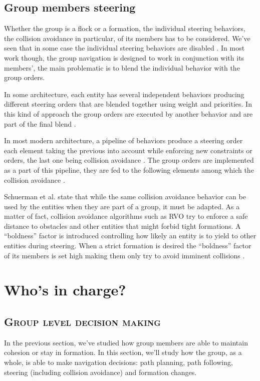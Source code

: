 \documentclass[a4paper,titlepage]{article}
\newcommand{\sectionsubtitle}[1]{{\subsection*{\scshape #1}}}
\begin{document}
\subsection{Group members steering}
\label{sec:stay_grouped:group_members_steering}

Whether the group is a flock or a formation, the individual steering behaviors, the collision avoidance in particular, of its members has to be considered. We’ve seen that in some case the individual steering behaviors are disabled \cite{Pottinger:1999vk}. In most work though, the group navigation is designed to work in conjunction with its members’, the main problematic is to blend the individual behavior with the group orders.

In some architecture, each entity has several independent behaviors producing different steering orders that are blended together using weight and priorities. In this kind of approach the group orders are executed by another behavior and are part of the final blend \cite{Moussaid:2010ib,Qiu:2010ww,Hostetler:2002wg}. 

In most modern architecture, a pipeline of behaviors produce a steering order each element taking the previous into account while enforcing new constraints or orders, the last one being collision avoidance \cite{GolaemPath:tw,Mononen:2010wp}. The group orders are implemented as a part of this pipeline, they are fed to the following elements among which the collision avoidance \cite{Karamouzas:2010fi,Silveira:2008bc}. 

Schuerman et al. state that while the same collision avoidance behavior can be used by the entities when they are part of a group, it must be adapted. As a matter of fact, collision avoidance algorithms such as RVO \cite{vandenBerg:2008tu} try to enforce a safe distance to obstacles and other entities that might forbid tight formations. A “boldness” factor is introduced controlling how likely an entity is to yield to other entities during steering. When a strict formation is desired the “boldness” factor of its members is set high making them only try to avoid imminent collisions \cite{Schuerman:2010um}.

\section{Who's in charge?}
\label{sec:who_s_in_charge}
\sectionsubtitle{Group level decision making}

In the previous section, we've studied how group members are able to maintain cohesion or stay in formation. In this section, we’ll study how the group, as a whole, is able to make navigation decisions: path planning, path following, steering (including collision avoidance) and formation changes. 
\end{document}

